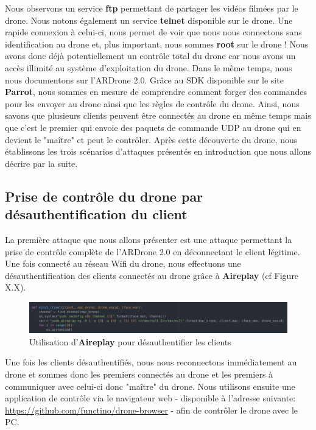 Nous observons un service \textbf{ftp} permettant de partager les vidéos filmées par le drone. Nous notons également un service \textbf{telnet} disponible sur le drone. Une rapide connexion à celui-ci, nous permet de voir que nous nous connectons sans identification au drone et, plus important, nous sommes \textbf{root} sur le drone ! Nous avons donc déjà potentiellement un contrôle total du drone car nous avons un accès illimité au système d'exploitation du drone.
\newline
Dans le même temps, nous nous documentons sur l'ARDrone 2.0. Grâce au SDK disponible sur le site \textbf{Parrot}, nous sommes en mesure de comprendre comment forger des commandes pour les envoyer au drone ainsi que les règles de contrôle du drone. Ainsi, nous savons que plusieurs clients peuvent être connectés au drone en même temps mais que c'est le premier qui envoie des paquets de commande UDP au drone qui en devient le "maître" et peut le contrôler.
\newline Après cette découverte du drone, nous établissons les trois scénarios d'attaques présentés en introduction que nous allons décrire par la suite.

\subsection{Prise de contrôle du drone par désauthentification du client}
La première attaque que nous allons présenter est une attaque permettant la prise de contrôle complète de l'ARDrone 2.0 en déconnectant le client légitime. Une fois connecté au réseau Wifi du drone, nous effectuons une désauthentification des clients connectés au drone grâce à \textbf{Aireplay} (cf Figure X.X).

\begin{figure}[H]
  \centering
  \includegraphics[scale=0.3]{images/aireplay.png}
  \caption{Utilisation d'\textbf{Aireplay} pour désauthentifier les clients}
\end{figure}

Une fois les clients désauthentifiés, nous nous reconnectons immédiatement au drone et sommes donc les premiers connectés au drone et les premiers à communiquer avec celui-ci donc "maître" du drone. Nous utilisons ensuite une application de contrôle via le navigateur web - disponible à l'adresse suivante: \url{https://github.com/functino/drone-browser} - afin de contrôler le drone avec le PC.

